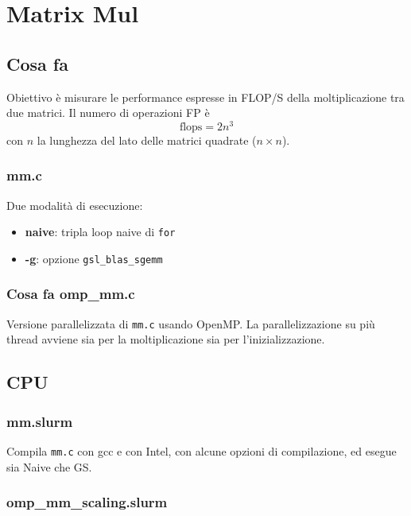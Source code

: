 \documentclass[a4paper,12pt]{article}
\begin{document}
\section{Matrix Mul}

\subsection{Cosa fa}

Obiettivo \`e misurare le performance espresse in FLOP/S della moltiplicazione tra due matrici. Il numero di operazioni FP \`e
\[
\text{flops} = 2n^3
\]
con $n$ la lunghezza del lato delle matrici quadrate ($n \times n$).

\subsubsection{mm.c}

Due modalit\`a di esecuzione:
\begin{itemize}
    \item \textbf{naive}: tripla loop naive di \texttt{for}
    \item \textbf{-g}: opzione \texttt{gsl\_blas\_sgemm}
\end{itemize}

\subsubsection{Cosa fa omp\_mm.c}

Versione parallelizzata di \texttt{mm.c} usando OpenMP. La parallelizzazione su pi\`u thread avviene sia per la moltiplicazione sia per l'inizializzazione.

\subsection{CPU}

\subsubsection{mm.slurm}

Compila \texttt{mm.c} con gcc e con Intel, con alcune opzioni di compilazione, ed esegue sia Naive che GS.

\subsubsection{omp\_mm\_scaling.slurm}
\end{document}
